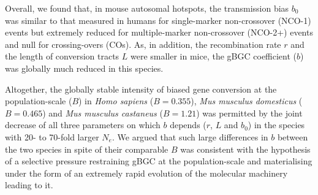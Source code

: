 Overall, we found that, in mouse autosomal hotspots, the transmission bias $b_0$ was similar to that measured in humans for single-marker non-crossover (NCO-1) events but extremely reduced for multiple-marker non-crossover (NCO-2+) events and null for crossing-overs (COs).
As, in addition, the recombination rate $r$ and the length of conversion tracts $L$ were smaller in mice, the gBGC coefficient ($b$) was globally much reduced in this species.

Altogether, the globally stable intensity of biased gene conversion at the population-scale ($B$) in \textit{Homo sapiens} ($B = 0.355$), \textit{Mus musculus domesticus} ($B = 0.465$) and \textit{Mus musculus castaneus} ($B = 1.21$) was permitted by the joint decrease of all three parameters on which $b$ depends ($r$, $L$ and $b_0$) in the species with 20- to 70-fold larger $N_e$.
We argued that such large differences in $b$ between the two species in spite of their comparable $B$ was consistent with the hypothesis of a selective pressure restraining gBGC at the population-scale and materialising under the form of an extremely rapid evolution of the molecular machinery leading to it.

